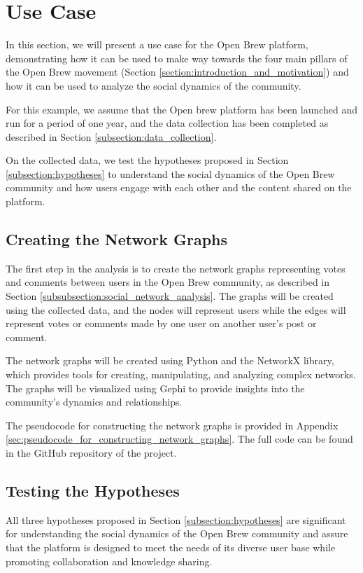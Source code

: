 \documentclass[12pt]{article}
\begin{document}
\section{Use Case}
\label{section:use_case}
In this section, we will present a use case for the Open Brew platform, demonstrating how it can be used to make way towards the four main pillars of the Open Brew movement (Section \ref{section:introduction_and_motivation}) and how it can be used to analyze the social dynamics of the community.

For this example, we assume that the Open brew platform has been launched and run for a period of one year, and the data collection has been completed as described in Section \ref{subsection:data_collection}.

On the collected data, we test the hypotheses proposed in Section \ref{subsection:hypotheses} to understand the social dynamics of the Open Brew community and how users engage with each other and the content shared on the platform.

\subsection{Creating the Network Graphs}
\label{subsection:creating_network_graphs}
The first step in the analysis is to create the network graphs representing votes and comments between users in the Open Brew community, as described in Section \ref{subsubsection:social_network_analysis}. The graphs will be created using the collected data, and the nodes will represent users while the edges will represent votes or comments made by one user on another user's post or comment.

The network graphs will be created using Python and the NetworkX library, which provides tools for creating, manipulating, and analyzing complex networks. The graphs will be visualized using Gephi to provide insights into the community's dynamics and relationships.

The pseudocode for constructing the network graphs is provided in Appendix \ref{sec:pseudocode_for_constructing_network_graphs}. The full code can be found in the GitHub repository of the project.

\subsection{Testing the Hypotheses}
\label{subsection:testing_hypotheses}
All three hypotheses proposed in Section \ref{subsection:hypotheses} are significant for understanding the social dynamics of the Open Brew community and assure that the platform is designed to meet the needs of its diverse user base while promoting collaboration and knowledge sharing.
\end{document}
